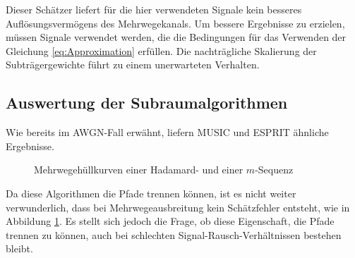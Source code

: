 Dieser Schätzer liefert für die hier verwendeten Signale kein besseres Auflösungsvermögens des Mehrwegekanals. Um bessere Ergebnisse zu erzielen, müssen Signale verwendet werden, die die Bedingungen für das Verwenden der Gleichung \eqref{eq:Approximation} erfüllen. Die nachträgliche Skalierung der Subträgergewichte führt zu einem unerwarteten Verhalten.  

\subsection{Auswertung der Subraumalgorithmen}

Wie bereits im \gls{AWGN}-Fall erwähnt, liefern \gls{MUSIC} und \gls{ESPRIT} ähnliche Ergebnisse. 
\begin{figure}
	\caption{Mehrwegehüllkurven einer Hadamard- und einer $m$-Sequenz}
	\label{fig:ESPIT_Mehrwege}
\end{figure}
Da diese Algorithmen die Pfade trennen können, ist es nicht weiter verwunderlich, dass bei Mehrwegeausbreitung kein Schätzfehler entsteht, wie in Abbildung \ref{fig:ESPIT_Mehrwege}. 
Es stellt sich jedoch die Frage, ob diese Eigenschaft, die Pfade trennen zu können, auch bei schlechten Signal-Rausch-Verhältnissen bestehen bleibt. 

